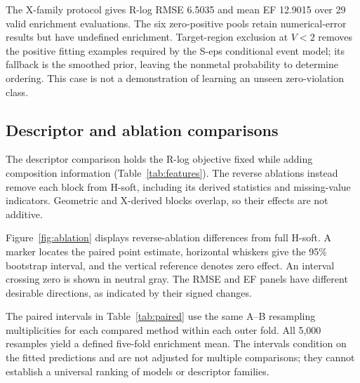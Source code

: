 The X-family protocol gives R-log RMSE 6.5035 and mean EF 12.9015 over 29 valid enrichment evaluations. The six zero-positive pools retain numerical-error results but have undefined enrichment. Target-region exclusion at $V<2$ removes the positive fitting examples required by the S-eps conditional event model; its fallback is the smoothed prior, leaving the nonmetal probability to determine ordering. This case is not a demonstration of learning an unseen zero-violation class.
\FloatBarrier

\subsection{Descriptor and ablation comparisons}
The descriptor comparison holds the R-log objective fixed while adding composition information (Table~\ref{tab:features}). The reverse ablations instead remove each block from H-soft, including its derived statistics and missing-value indicators. Geometric and X-derived blocks overlap, so their effects are not additive.


Figure~\ref{fig:ablation} displays reverse-ablation differences from full H-soft. A marker locates the paired point estimate, horizontal whiskers give the 95\% bootstrap interval, and the vertical reference denotes zero effect. An interval crossing zero is shown in neutral gray. The RMSE and EF panels have different desirable directions, as indicated by their signed changes.

The paired intervals in Table~\ref{tab:paired} use the same A--B resampling multiplicities for each compared method within each outer fold. All 5,000 resamples yield a defined five-fold enrichment mean. The intervals condition on the fitted predictions and are not adjusted for multiple comparisons; they cannot establish a universal ranking of models or descriptor families.

\FloatBarrier
